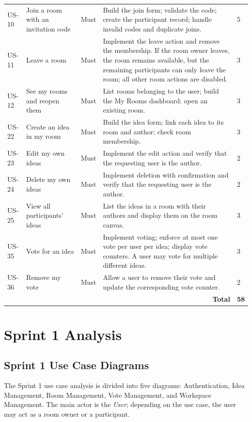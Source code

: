 \documentclass[12pt,a4paper]{report}
\begin{document}
\begin{longtable}{@{}p{}p{}p{}p{}p{}@{}}
US-10 & Join a room with an invitation code & Must & Build the join form; validate the code; create the participant record; handle invalid codes and duplicate joins. & 5 \\
US-11 & Leave a room & Must & Implement the leave action and remove the membership. If the room owner leaves, the room remains available, but the remaining participants can only leave the room; all other room actions are disabled. & 3 \\
US-12 & See my rooms and reopen them & Must & List rooms belonging to the user; build the My Rooms dashboard; open an existing room. & 3 \\
US-22 & Create an idea in my room & Must & Build the idea form; link each idea to its room and author; check room membership. & 3 \\
US-23 & Edit my own ideas & Must & Implement the edit action and verify that the requesting user is the author. & 2 \\
US-24 & Delete my own ideas & Must & Implement deletion with confirmation and verify that the requesting user is the author. & 2 \\
US-25 & View all participants' ideas & Must & List the ideas in a room with their authors and display them on the room canvas. & 3 \\
US-35 & Vote for an idea & Must & Implement voting; enforce at most one vote per user per idea; display vote counters. A user may vote for multiple different ideas. & 3 \\
US-36 & Remove my vote & Must & Allow a user to remove their vote and update the corresponding vote counter. & 2 \\
\midrule
\multicolumn{4}{r}{\textbf{Total}} & \textbf{58} \\
\end{longtable}
\normalsize

\section{Sprint 1 Analysis}
\subsection{Sprint 1 Use Case Diagrams}

The Sprint 1 use case analysis is divided into five diagrams: Authentication, Idea Management, Room Management, Vote Management, and Workspace Management. The main actor is the \textit{User}; depending on the use case, the user may act as a room owner or a participant.
\end{document}
